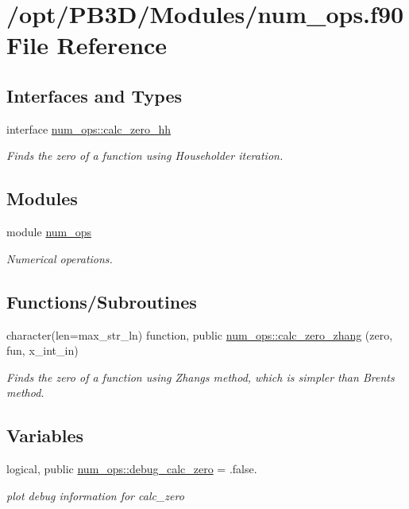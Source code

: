 \hypertarget{num__ops_8f90}{}\section{/opt/\+P\+B3\+D/\+Modules/num\+\_\+ops.f90 File Reference}
\label{num__ops_8f90}
\subsection*{Interfaces and Types}
\begin{DoxyCompactItemize}
\item 
interface \hyperlink{interfacenum__ops_1_1calc__zero__hh}{num\+\_\+ops\+::calc\+\_\+zero\+\_\+hh}
\begin{DoxyCompactList}\small\item\em Finds the zero of a function using Householder iteration. \end{DoxyCompactList}\end{DoxyCompactItemize}
\subsection*{Modules}
\begin{DoxyCompactItemize}
\item 
module \hyperlink{namespacenum__ops}{num\+\_\+ops}
\begin{DoxyCompactList}\small\item\em Numerical operations. \end{DoxyCompactList}\end{DoxyCompactItemize}
\subsection*{Functions/\+Subroutines}
\begin{DoxyCompactItemize}
\item 
character(len=max\+\_\+str\+\_\+ln) function, public \hyperlink{namespacenum__ops_adcc4eacf15c931744316a004f4448b90}{num\+\_\+ops\+::calc\+\_\+zero\+\_\+zhang} (zero, fun, x\+\_\+int\+\_\+in)
\begin{DoxyCompactList}\small\item\em Finds the zero of a function using Zhang\textquotesingle{}s method, which is simpler than Brent\textquotesingle{}s method. \end{DoxyCompactList}\end{DoxyCompactItemize}
\subsection*{Variables}
\begin{DoxyCompactItemize}
\item 
logical, public \hyperlink{namespacenum__ops_aca06cb91f215c46429e23fbaf8611e5a}{num\+\_\+ops\+::debug\+\_\+calc\+\_\+zero} = .false.
\begin{DoxyCompactList}\small\item\em plot debug information for calc\+\_\+zero \end{DoxyCompactList}\end{DoxyCompactItemize}
